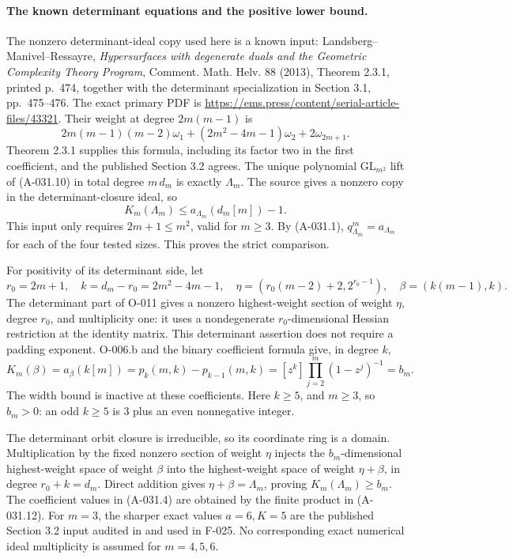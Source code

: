 \paragraph{The known determinant equations and the positive lower bound.}
The nonzero determinant-ideal copy used here is a known input:
Landsberg--Manivel--Ressayre,
\emph{Hypersurfaces with degenerate duals and the Geometric
Complexity Theory Program}, Comment. Math. Helv. 88 (2013),
Theorem 2.3.1, printed p.~474, together with the determinant
specialization in Section 3.1, pp.~475--476.
The exact primary PDF is
\url{https://ems.press/content/serial-article-files/43321}.
Their weight at degree \(2m(m-1)\) is
\[
 2m(m-1)(m-2)\omega_1+(2m^2-4m-1)\omega_2+2\omega_{2m+1}.
                                                               \tag{A-031.10}
\]
Theorem 2.3.1 supplies this formula, including its factor two
in the first coefficient, and the published Section 3.2 agrees.
The unique polynomial \(\mathrm{GL}_{m^2}\) lift of (A-031.10)
in total degree \(m\,d_m\) is exactly \(\Lambda_m\).
The source gives a nonzero copy in the determinant-closure ideal,
so
\[
             K_m(\Lambda_m)\leq a_{\Lambda_m}(d_m[m])-1.         \tag{A-031.11}
\]
This input only requires \(2m+1\leq m^2\), valid for \(m\geq3\).
By (A-031.1), \(q^m_{\Lambda_m}=a_{\Lambda_m}\) for each of
the four tested sizes. This proves the strict comparison.

For positivity of its determinant side, let
\[
 r_0=2m+1,\quad k=d_m-r_0=2m^2-4m-1,\quad
 \eta=(r_0(m-2)+2,2^{r_0-1}),\quad
 \beta=(k(m-1),k).
\]
The determinant part of O-011 gives a nonzero highest-weight
section of weight \(\eta\), degree \(r_0\), and multiplicity one:
it uses a nondegenerate \(r_0\)-dimensional Hessian restriction
at the identity matrix. This determinant assertion does not
require a padding exponent. O-006.b and the binary coefficient
formula give, in degree \(k\),
\[
 K_m(\beta)=a_\beta(k[m])
   =p_k(m,k)-p_{k-1}(m,k)
   =[z^k]\prod_{j=2}^m(1-z^j)^{-1}=b_m.                        \tag{A-031.12}
\]
The width bound is inactive at these coefficients.
Here \(k\geq5\), and \(m\geq3\), so \(b_m>0\):
an odd \(k\geq5\) is \(3\) plus an even nonnegative integer.

The determinant orbit closure is irreducible, so its coordinate
ring is a domain. Multiplication by the fixed nonzero section
of weight \(\eta\) injects the \(b_m\)-dimensional highest-weight
space of weight \(\beta\) into the highest-weight space of
weight \(\eta+\beta\), in degree \(r_0+k=d_m\).
Direct addition gives \(\eta+\beta=\Lambda_m\), proving
\(K_m(\Lambda_m)\geq b_m\). The coefficient values in
(A-031.4) are obtained by the finite product in (A-031.12).
For \(m=3\), the sharper exact values \(a=6,K=5\) are the
published Section 3.2 input audited in
 and used in F-025.
No corresponding exact numerical ideal multiplicity is assumed
for \(m=4,5,6\).

